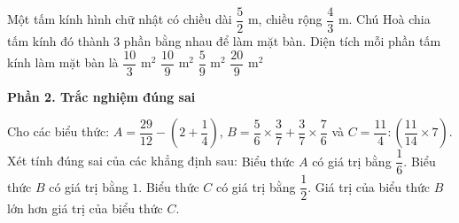 \begin{ex} %
Một tấm kính hình chữ nhật có chiều dài $\dfrac{5}{2}\text{ m}$, chiều rộng $\dfrac{4}{3}\text{ m}$. Chú Hoà chia tấm kính đó thành $3$ phần bằng nhau để làm mặt bàn. Diện tích mỗi phần tấm kính làm mặt bàn là
\choice
{$\dfrac{10}{3}\text{ m}^2$}
{\True $\dfrac{10}{9}\text{ m}^2$}
{$\dfrac{5}{9}\text{ m}^2$}
{$\dfrac{20}{9}\text{ m}^2$}
\end{ex}

\textbf{Phần 2. Trắc nghiệm đúng sai}

\begin{ex} %
Cho các biểu thức: $A = \dfrac{29}{12} - \left(2 + \dfrac{1}{4}\right)$, $B = \dfrac{5}{6} \times \dfrac{3}{7} + \dfrac{3}{7} \times \dfrac{7}{6}$ và $C = \dfrac{11}{4} : \left(\dfrac{11}{14} \times 7\right)$. Xét tính đúng sai của các khẳng định sau:
\choiceTF
{\True Biểu thức $A$ có giá trị bằng $\dfrac{1}{6}$.}
{Biểu thức $B$ có giá trị bằng $1$.}
{\True Biểu thức $C$ có giá trị bằng $\dfrac{1}{2}$.}
{\True Giá trị của biểu thức $B$ lớn hơn giá trị của biểu thức $C$.}
\end{ex}

